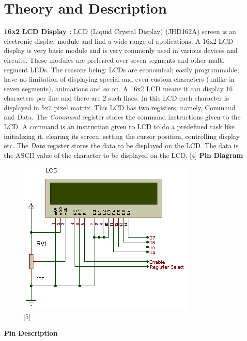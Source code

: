 \documentclass[11pt,a4paper]{article}
\begin{document}
	\newpage
	\section{Theory and Description}
	
	\textbf{16x2 LCD Display :}
	\vspace{0.3cm}
	\newline
	LCD (Liquid Crystal Display) (JHD162A) screen is an electronic display module and find a wide range of applications. A 16x2 LCD display is very basic module and is very commonly used in various devices and circuits. These modules are preferred over seven segments and other multi segment LEDs. The reasons being: LCDs are economical; easily programmable; have no limitation of displaying special and even custom characters (unlike in seven segments), animations and so on.
	\flushleft
	A 16x2 LCD means it can display 16 characters per line and there are 2 such lines. In this LCD each character is displayed in 5x7 pixel matrix. This LCD has two registers, namely, Command and Data. The \textit{Command} register stores the command instructions given to the LCD. A command is an instruction given to LCD to do a predefined task like initializing it, clearing its screen, setting the cursor position, controlling display etc. The \textit{Data} register stores the data to be displayed on the LCD. The data is the ASCII value of the character to be displayed on the LCD. [4]
	\vspace{0.3cm}
	\textbf{Pin Diagram}
    \begin{figure}[h!]
    	\includegraphics[scale=0.9]{lcd.png}
    	\centering
    	\caption{[5]}
    \end{figure} 
    	
	\newpage
	\flushleft
	\textbf{Pin Description }
	\vspace{0.3cm}
	
\end{document}
